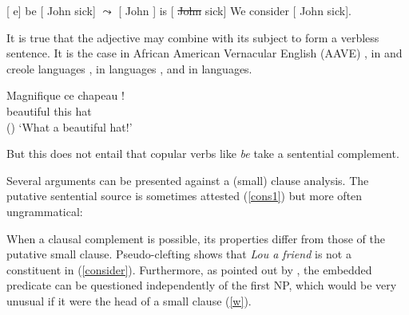 \eal
\ex
\label{rais-transformational}
{}[ e] be [ John sick] $\leadsto$  [ John ] is  [ \st{John} sick]
\ex
\label{ecm}
We consider [ John sick].
\zl

It is true that the adjective may combine with its subject to form a verbless sentence. It is the
case in African American Vernacular English (AAVE) \citep{Bender2001a}\addpages, in  \citep{Laurens2008}\addpages and creole languages
\citep[134]{HenriandAbeille2007}, in  languages \citep{Zec87a-u}\addpages, and in  languages.

\ea
\gll Magnifique ce chapeau !\\
     beautiful this hat\\\hfill{()}
\glt `What a beautiful hat!'
\z

\noindent
But this does not entail that copular verbs like \emph{be} take a sentential complement. 




Several arguments can be presented against a (small) clause
analysis. The putative sentential source is sometimes attested (\ref{cons1}) but more often
ungrammatical:
	
\eal
{}
\zl

	
When a clausal complement is possible, its properties differ from those of the putative small
clause. Pseudo-clefting shows that \textit{Lou a friend} is not a constituent in
(\ref{consider}). Furthermore, as pointed out by \citet{Williams83a}, the embedded predicate can be
questioned independently of the first NP, which would be very unusual if it were the head of a small
clause (\ref{w}). 

